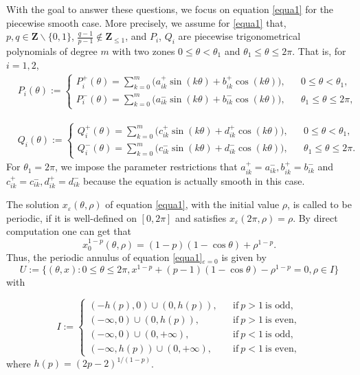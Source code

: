 \documentclass[11pt]{amsart}
\theoremstyle{remark}
\theoremstyle{definition}
\begin{document}
 With the goal to answer these questions, we focus on   equation \eqref{equa1} for the piecewise smooth case. More   precisely, we assume for \eqref{equa1} that,
 $  p,q\in \mathbf{Z}\backslash\{0, 1\}$, $ \frac{q-1}{p-1}\notin \mathbf{Z}_{\leq1} $, and $P_i$, $ Q_i$ are piecewise trigonometrical polynomials of degree $ m $ with two zones $0\leq\theta<\theta_1$ and $\theta_1\leq\theta\leq2\pi$. That is, for $i=1,2$,
\begin{align}\label{equa1-1}
&P_i(\theta):=
\left\{
\begin{aligned}
P_i^+(\theta)=\sum_{k=0}^{m}\big(a_{ik}^{+}\sin (k\theta) + b_{ik}^{+}\cos (k\theta)\big)    , && 0   \le  \theta <  \theta_{1},  \\
P_i^-(\theta)=\sum_{k=0}^{m}\big(a_{ik}^{-}\sin (k\theta) + b_{ik}^{-}\cos (k\theta)\big)    , && \theta_{1} \leq \theta \le 2\pi,
\end{aligned}
\right.
\end{align}

\begin{align}\label{equa1-2}
&Q_i(\theta):=
\left\{
\begin{aligned}
Q_i^+(\theta)=\sum_{k=0}^{m}\big(c_{ik}^{+}\sin (k\theta) + d_{ik}^{+}\cos (k\theta)\big)    , && 0   \le  \theta <  \theta_{1},  \\
Q_i^-(\theta)=\sum_{k=0}^{m}\big(c_{ik}^{-}\sin (k\theta) + d_{ik}^{-}\cos (k\theta)\big)    , && \theta_{1} \leq \theta \le 2\pi.
\end{aligned}
\right.
\end{align}
For $\theta_1=2\pi$, we impose the parameter restrictions that $a_{ik}^+=a_{ik}^-, b_{ik}^+=b_{ik}^-$ and $c_{ik}^+=c_{ik}^-, d_{ik}^+=d_{ik}^-$ because the equation is actually smooth in this case.


The solution  $x_{\varepsilon}(\theta,\rho)$ of equation \eqref{equa1},  with the initial value $\rho$, is called to be periodic, if it is well-defined on $[0, 2\pi]$ and satisfies $x_{\varepsilon}(2\pi,\rho)=\rho$.
  By direct computation one can get that
\begin{equation}\label{equa1-3}
 x_{0}^{1-p}(\theta,\rho)=(1-p)(1-\cos\theta)+\rho^{1-p}.
\end{equation}
Thus, the periodic annulus of equation \eqref{equa1}$_{\varepsilon=0}$ is given by  $$U:=\{(\theta, x): 0\leq\theta\leq 2\pi, x^{1-p}+(p-1)(1-\cos\theta)-\rho^{1-p}=0, \rho\in I\}$$ with

\begin{equation*}\label{equa1I}
I:=
\left\{
\begin{aligned}
(-h(p),0)\cup (0, h(p)), &&  \mbox{if} \ p>1 \ \mbox{is odd},  \\
(-\infty,0)\cup (0, h(p)), &&  \mbox{if}\  p>1 \ \mbox{is even},\\
(-\infty,0)\cup (0, +\infty), &&  \mbox{if}\  p<1 \ \mbox{is odd},\\
(-\infty,h(p))\cup (0, +\infty), &&  \mbox{if}\  p<1 \ \mbox{is even},
\end{aligned}
\right.
\end{equation*}
where $h(p)=(2p-2)^{1/(1-p)}$.
\end{document}
